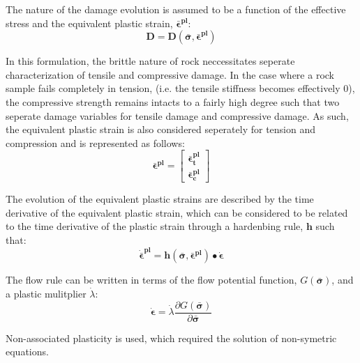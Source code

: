 The nature of the damage evolution is assumed to be a function of the effective stress and the equivalent plastic strain, $\boldsymbol{\bar{\epsilon}^{pl}}$:
\begin{equation}
\label{eqn:const8}
\mathbf{D} = \mathbf{D}(\boldsymbol{\bar{\sigma}}, \boldsymbol{\bar{\epsilon}^{pl}})
\end{equation}

In this formulation, the brittle nature of rock neccessitates seperate characterization of tensile and compressive damage. In the case where a rock sample fails completely in tension, (i.e. the tensile stiffness becomes effectively 0), the compressive strength remains intacts to a fairly high degree such that two seperate damage variables for tensile damage and compressive damage. As such, the equivalent plastic strain is also considered seperately for tension and compression and is represented as follows:
\begin{equation}
\label{eqn:const9}
\boldsymbol{\bar{\epsilon}^{pl}} = \begin{bmatrix} 
	\boldsymbol{\bar{\epsilon}_t^{pl}} \\ 
	\boldsymbol{\bar{\epsilon}_c^{pl}} \end{bmatrix}
\end{equation}

The evolution of the equivalent plastic strains are described by the time derivative of the equivalent plastic strain, which can be considered to be related to the time derivative of the plastic strain through a hardenbing rule, $\mathbf{h}$ such that:
\begin{equation}
\label{eqn:const10}
\boldsymbol{\dot{\bar{\epsilon}}^{pl}} = \mathbf{h}(\boldsymbol{\bar{\sigma}},
	\boldsymbol{\bar{\epsilon}^{pl}})\bullet \boldsymbol{\dot{\epsilon}} 
\end{equation}

The flow rule can be written in terms of the flow potential function, $G(\boldsymbol{\bar{\sigma}})$, and a plastic mulitplier $\dot{\lambda}$:
\begin{equation}
\label{eqn:const11}
\boldsymbol{\dot{\epsilon}} = \dot{\lambda} \dfrac{\partial G(\boldsymbol{\bar{\sigma}})}{\partial \boldsymbol{\bar{\sigma}}}
\end{equation}

Non-associated plasticity  is used, which required the solution of non-symetric equations.



